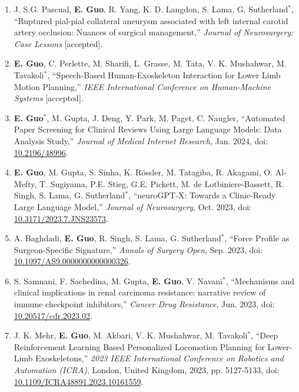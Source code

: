 \documentclass{article}
\begin{document}
\begin{enumerate}
    \item J. S.G. Pascual, \textbf{E. Guo}, R. Yang, K. D. Langdon, S. Lama, G. Sutherland$^*$, ``Ruptured pial-pial collateral aneurysm associated with left internal carotid artery occlusion: Nuances of surgical management,'' \textit{Journal of Neurosurgery: Case Lessons} [accepted].
    \item \textbf{E. Guo}, C. Perlette, M. Sharifi, L. Grasse, M. Tata, V. K. Mushahwar, M. Tavakoli$^*$, ``Speech-Based Human-Exoskeleton Interaction for Lower Limb Motion Planning,''  \textit{IEEE International Conference on Human-Machine Systems} [accepted].
    \item \textbf{E. Guo}$^*$, M. Gupta, J. Deng, Y. Park, M. Paget, C. Naugler, ``Automated Paper Screening for Clinical Reviews Using Large Language Models: Data Analysis Study,'' \textit{Journal of Medical Internet Research}, Jan. 2024, doi: \href{https://doi.org/10.2196/48996}{10.2196/48996}.
    \item \textbf{E. Guo}, M. Gupta, S. Sinha, K. R\"ossler, M. Tatagiba, R. Akagami, O. Al-Mefty, T. Sugiyama, P.E. Stieg, G.E. Pickett, M. de Lotbiniere-Bassett, R. Singh, S. Lama, G. Sutherland$^*$, ``neuroGPT-X: Towards a Clinic-Ready Large Language Model,'' \textit{Journal of Neurosurgery}, Oct. 2023, doi: \href{https://doi.org/10.3171/2023.7.JNS23573}{10.3171/2023.7.JNS23573}.
    \item A. Baghdadi, \textbf{E. Guo}, R. Singh, S. Lama, G. Sutherland$^*$, ``Force Profile as Surgeon-Specific Signature,'' \textit{Annals of Surgery Open}, Sep. 2023, doi: \href{https://doi.org/10.1097/AS9.0000000000000326}{10.1097/AS9.0000000000000326}.
    \item S. Samnani, F. Sachedina, M. Gupta, \textbf{E. Guo}, V. Navani$^*$, ``Mechanisms and clinical implications in renal carcinoma resistance: narrative review of immune checkpoint inhibitors,'' \textit{Cancer Drug Resistance}, Jun. 2023, doi: \href{https://doi.org/10.20517/cdr.2023.02 }{10.20517/cdr.2023.02}.
    \item J. K. Mehr, \textbf{E. Guo}, M. Akbari, V. K. Mushahwar, M. Tavakoli$^*$, ``Deep Reinforcement Learning Based Personalized Locomotion Planning for Lower-Limb Exoskeletons,'' \textit{2023 IEEE International Conference on Robotics and Automation (ICRA)}, London, United Kingdom, 2023, pp. 5127-5133, doi: \href{https://doi.org/10.1109/ICRA48891.2023.10161559}{10.1109/ICRA48891.2023.10161559}.

\end{enumerate}
\end{document}
